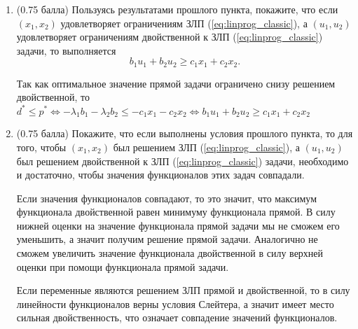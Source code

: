 \documentclass[a5paper,twoside,russian]{article}
\begin{document}
\begin{enumerate}[label=\textbf{Задача \arabic*.}]
\begin{enumerate}
            \item (0.75 балла) Пользуясь результатами прошлого пункта, покажите, что если $(x_1, x_2)$ удовлетворяет ограничениям ЗЛП (\ref{eq:linprog_classic}), а $(u_1, u_2)$ удовлетворяет ограничениям двойственной к ЗЛП (\ref{eq:linprog_classic}) задачи, то выполняется
            \begin{equation*}
                b_1 u_1 + b_2 u_2 \geq c_1 x_1 + c_2 x_2.
            \end{equation*}
            \begin{prf}
                Так как оптимальное значение прямой задачи ограничено снизу решением двойственной, то
                $d^* \leq p^* \Leftrightarrow -\lambda_1 b_1 - \lambda_2 b_2 \leq -c_1 x_1 - c_2 x_2 \Leftrightarrow
                b_1 u_1 + b_2 u_2 \geq c_1 x_1 + c_2 x_2$
            \end{prf}

            \item (0.75 балла) Покажите, что если выполнены условия прошлого пункта, то для того, чтобы $(x_1, x_2)$ был решением ЗЛП (\ref{eq:linprog_classic}), а $(u_1, u_2)$ был решением двойственной к ЗЛП (\ref{eq:linprog_classic}) задачи, необходимо и достаточно, чтобы значения функционалов этих задач совпадали.
            \begin{prf}
                Если значения функционалов совпадают, то это значит, что максимум функционала двойственной равен
                минимуму функционала прямой.
                В силу нижней оценки на значение функционала прямой задачи мы не сможем его уменьшить, а значит получим
                решение прямой задачи.
                Аналогично не сможем увеличить значение функционала двойственной в силу верхней оценки при помощи
                функционала прямой задачи.

                Если переменные являются решением ЗЛП прямой и двойственной, то в силу линейности функционалов верны
                условия Слейтера, а значит имеет место сильная двойственность, что означает совпадение значений функционалов.
            \end{prf}

        \end{enumerate}

    \end{enumerate}
\end{document}
